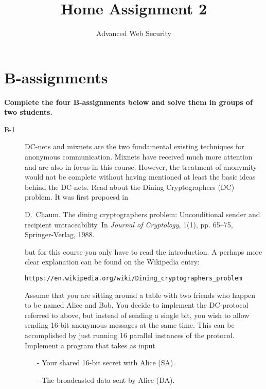 \documentclass{article}
\begin{document}
\title{Home Assignment 2}
\author{Advanced Web Security}
\date{\the\year}

\maketitle

\section*{B-assignments}
\textbf{Complete the four B-assignments below and solve them in groups of two students.}

\begin{description}
	\item[B-1]{DC-nets and mixnets are the two fundamental existing techniques for anonymous communication. Mixnets have received much more attention and are also in focus in this course. However, the treatment of anonymity would not be complete without having mentioned at least the basic ideas behind the DC-nets. Read about the Dining Cryptographers (DC) problem. It was first propoesd in
	\begin{center}
		\begin{minipage}{0.8\textwidth}
			D.~Chaum. The dining cryptographers problem: Unconditional sender and recipient untraceability. In \textit{Journal of Cryptology}, 1(1), pp. 65--75, Springer-Verlag, 1988.
		\end{minipage}
	\end{center}
	but for this course you only have to read the introduction. A perhaps more clear explanation can be found on the Wikipedia entry:
	\begin{center}
		\begin{minipage}{0.8\textwidth}
			\verb|https://en.wikipedia.org/wiki/Dining_cryptographers_problem|
		\end{minipage}
	\end{center}
	Assume that you are sitting around a table with two friends who happen to be named Alice and Bob. You decide to implement the DC-protocol referred to above, but instead of sending a single bit, you wish to allow sending 16-bit anonymous messages at the same time. This can be accomplished by just running 16 parallel instances of the protocol. Implement a program that takes as input
	\begin{itemize}
		\item[-] Your shared 16-bit secret with Alice (SA).
		\item[-] The broadcasted data sent by Alice (DA).

\end{itemize}}
\end{description}
\end{document}
